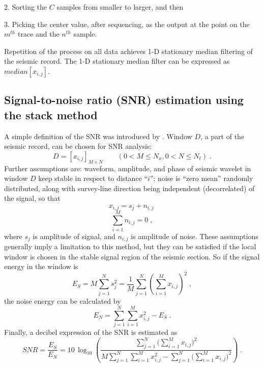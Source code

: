 2. Sorting the $C$ samples from smaller to larger, and then

3. Picking the center value, after sequencing, as the output at the point on the $m^{th}$ trace 
and the $n^{th}$ sample.

Repetition of the process on all data achieves 
1-D stationary median filtering of the seismic record. The 1-D stationary median 
filter can be expressed as $median[x_{i,j}]$.

\subsection{Signal-to-noise ratio (SNR) estimation using the stack method}

A simple definition of the SNR was introduced by \cite{Liu97}. Window $D$, a part 
of the seismic record, can be chosen for SNR analysis: 
      \begin{equation}
        \label{eq:eq5}
          D = [x_{i,j}]_{M \times N} \qquad (0< M \le N_x, 0< N \le N_t)\;.
      \end{equation}
Further assumptions are: waveform, amplitude, and phase of seismic 
wavelet in window $D$ keep stable in respect to distance ``$i$''; noise is
``zero mean'' randomly distributed, along with survey-line direction being independent 
(decorrelated) of the signal, so that
      \begin{equation}
        \label{eq:eq6}
          x_{i,j} = s_j + n_{i,j}\;
      \end{equation}
      \begin{equation}
        \label{eq:eq7}
          \sum_{i=1}^{M} n_{i,j} = 0\;,
      \end{equation}
where $s_j$ is amplitude of signal, and $n_{i,j}$ is amplitude of noise. These 
assumptions generally imply a limitation to this method, but they 
can be satisfied if the local window is chosen in the stable signal region of the 
seismic section. So if the signal energy in the window is 
      \begin{equation}
        \label{eq:eq8}
          E_S = M\sum_{j=1}^{N} s_{j}^2 = \frac{1}{M} \sum_{j=1}^{N}(\sum_{i=1}^{M}x_{i,j})^2\;,
      \end{equation}
the noise energy can be calculated by
      \begin{equation}
        \label{eq:eq9}
          E_N = \sum_{j=1}^{N}\! \sum_{i=1}^{M}x_{i,j}^2 - E_S\;.
      \end{equation}
Finally, a decibel expression of the SNR is estimated as
      \begin{equation}
          SNR = \frac{E_S}{E_N} = 
	  10\,\log_{10}{\left(\frac{\displaystyle\sum_{j=1}^{N}\big(\sum_{i=1}^{M}x_{i,j}\big)^2}{\displaystyle M\sum_{j=1}^{N}\! \sum_{i=1}^{M}x_{i,j}^2-\sum_{j=1}^{N}\big(\sum_{i=1}^{M}x_{i,j}\big)^2}\right)}\;.
        \label{eq:eq10}
      \end{equation}

